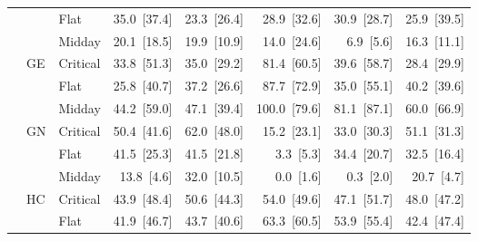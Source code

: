 \begin{tabular}{l l l r r r r r}
 &  & Flat & 35.0~{\color{seasoncol}\scriptsize[37.4]} & 23.3~{\color{seasoncol}\scriptsize[26.4]} & 28.9~{\color{seasoncol}\scriptsize[32.6]} & 30.9~{\color{seasoncol}\scriptsize[28.7]} & 25.9~{\color{seasoncol}\scriptsize[39.5]} \\
 &  & Midday & 20.1~{\color{seasoncol}\scriptsize[18.5]} & 19.9~{\color{seasoncol}\scriptsize[10.9]} & 14.0~{\color{seasoncol}\scriptsize[24.6]} & 6.9~{\color{seasoncol}\scriptsize[5.6]} & 16.3~{\color{seasoncol}\scriptsize[11.1]} \\
 & GE & Critical & 33.8~{\color{seasoncol}\scriptsize[51.3]} & 35.0~{\color{seasoncol}\scriptsize[29.2]} & 81.4~{\color{seasoncol}\scriptsize[60.5]} & 39.6~{\color{seasoncol}\scriptsize[58.7]} & 28.4~{\color{seasoncol}\scriptsize[29.9]} \\
 &  & Flat & 25.8~{\color{seasoncol}\scriptsize[40.7]} & 37.2~{\color{seasoncol}\scriptsize[26.6]} & 87.7~{\color{seasoncol}\scriptsize[72.9]} & 35.0~{\color{seasoncol}\scriptsize[55.1]} & 40.2~{\color{seasoncol}\scriptsize[39.6]} \\
 &  & Midday & 44.2~{\color{seasoncol}\scriptsize[59.0]} & 47.1~{\color{seasoncol}\scriptsize[39.4]} & 100.0~{\color{seasoncol}\scriptsize[79.6]} & 81.1~{\color{seasoncol}\scriptsize[87.1]} & 60.0~{\color{seasoncol}\scriptsize[66.9]} \\
 & GN & Critical & 50.4~{\color{seasoncol}\scriptsize[41.6]} & 62.0~{\color{seasoncol}\scriptsize[48.0]} & 15.2~{\color{seasoncol}\scriptsize[23.1]} & 33.0~{\color{seasoncol}\scriptsize[30.3]} & 51.1~{\color{seasoncol}\scriptsize[31.3]} \\
 &  & Flat & 41.5~{\color{seasoncol}\scriptsize[25.3]} & 41.5~{\color{seasoncol}\scriptsize[21.8]} & 3.3~{\color{seasoncol}\scriptsize[5.3]} & 34.4~{\color{seasoncol}\scriptsize[20.7]} & 32.5~{\color{seasoncol}\scriptsize[16.4]} \\
 &  & Midday & 13.8~{\color{seasoncol}\scriptsize[4.6]} & 32.0~{\color{seasoncol}\scriptsize[10.5]} & 0.0~{\color{seasoncol}\scriptsize[1.6]} & 0.3~{\color{seasoncol}\scriptsize[2.0]} & 20.7~{\color{seasoncol}\scriptsize[4.7]} \\
 & HC & Critical & 43.9~{\color{seasoncol}\scriptsize[48.4]} & 50.6~{\color{seasoncol}\scriptsize[44.3]} & 54.0~{\color{seasoncol}\scriptsize[49.6]} & 47.1~{\color{seasoncol}\scriptsize[51.7]} & 48.0~{\color{seasoncol}\scriptsize[47.2]} \\
 &  & Flat & 41.9~{\color{seasoncol}\scriptsize[46.7]} & 43.7~{\color{seasoncol}\scriptsize[40.6]} & 63.3~{\color{seasoncol}\scriptsize[60.5]} & 53.9~{\color{seasoncol}\scriptsize[55.4]} & 42.4~{\color{seasoncol}\scriptsize[47.4]} \\

\end{tabular}
